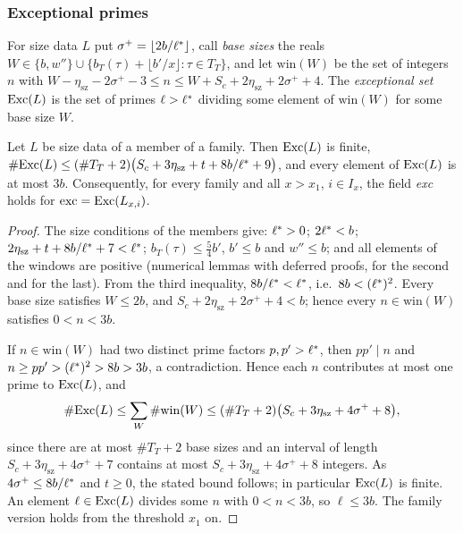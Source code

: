 \subsubsection{Exceptional primes}

\begin{definition}\label{pf:linkN-sel:excdef}
For size data $L$ put $\sigma^+=\lfloor2b/\ell^{*}\rfloor$, call \emph{base sizes} the reals $W\in\{b,w''\}\cup\{b_T(\tau)+
\lfloor b'/x\rfloor:\tau\in T_T\}$, and let $\mathrm{win}(W)$ be the set of integers $n$ with $W-\eta_{\mathrm{sz}}-2\sigma^+-3\le n
\le W+S_c+2\eta_{\mathrm{sz}}+2\sigma^++4$. The \emph{exceptional set} $\mathrm{Exc}(L)$ is the set of primes $\ell>\ell^{*}$ dividing
some element of $\mathrm{win}(W)$ for some base size $W$.
\end{definition}

\begin{lemma}\label{pf:linkN-sel:exc}
Let $L$ be size data of a member of a family. Then $\mathrm{Exc}(L)$ is finite,
$\#\mathrm{Exc}(L)\le(\#T_T+2)\bigl(S_c+3\eta_{\mathrm{sz}}+t+8b/\ell^{*}+9\bigr)$, and every element of $\mathrm{Exc}(L)$ is at
most $3b$. Consequently, for every family and all $x>x_1$, $i\in I_x$, the field \emph{exc} holds for $\mathrm{exc}=\mathrm{Exc}(L_{x,i})$.
\end{lemma}

\begin{proof}
The size conditions of the members give: $\ell^{*}>0$; $2\ell^{*}<b$; $2\eta_{\mathrm{sz}}+t+8b/\ell^{*}+7<\ell^{*}$;
$b_T(\tau)\le\frac54b'$, $b'\le b$ and $w''\le b$; and all elements of the windows are positive (numerical lemmas with deferred proofs,
 for the second and
 for the last). From the third inequality,
$8b/\ell^{*}<\ell^{*}$, i.e.\ $8b<(\ell^{*})^2$. Every base size satisfies $W\le2b$, and $S_c+2\eta_{\mathrm{sz}}+2\sigma^++4<b$;
hence every $n\in\mathrm{win}(W)$ satisfies $0<n<3b$.

If $n\in\mathrm{win}(W)$ had two distinct prime factors $p,p'>\ell^{*}$, then $pp'\mid n$ and $n\ge pp'>(\ell^{*})^2>8b>3b$, a
contradiction. Hence each $n$ contributes at most one prime to $\mathrm{Exc}(L)$, and
\[
\#\mathrm{Exc}(L)\le\sum_W\#\mathrm{win}(W)\le(\#T_T+2)\bigl(S_c+3\eta_{\mathrm{sz}}+4\sigma^++8\bigr),
\]
since there are at most $\#T_T+2$ base sizes and an interval of length $S_c+3\eta_{\mathrm{sz}}+4\sigma^++7$ contains at most
$S_c+3\eta_{\mathrm{sz}}+4\sigma^++8$ integers. As $4\sigma^+\le8b/\ell^{*}$ and $t\ge0$, the stated bound follows; in particular
$\mathrm{Exc}(L)$ is finite. An element $\ell\in\mathrm{Exc}(L)$ divides some $n$ with $0<n<3b$, so $\ell\le3b$. The family version holds
from the threshold $x_1$ on.
\end{proof}

